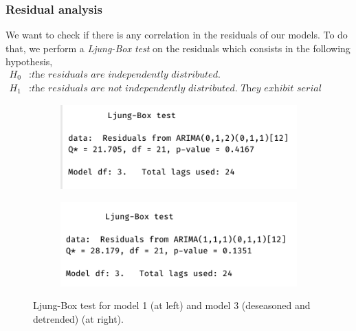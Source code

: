\subsubsection{Residual analysis}

We want to check if there is any correlation in the residuals of our models. To do that, we perform a \textit{Ljung-Box test} on the residuals which consists in the following hypothesis,
\begin{align*}
	H_0&: \textit{the residuals are independently distributed.} \\
	H_1&: \textit{the residuals are not independently distributed. They exhibit serial correlation instead.}
\end{align*}


\begin{figure}[H]
	\centering
	\begin{subfigure}{0.49\textwidth}
		\centering
		\includegraphics[width=\textwidth]{figures/box_jenkins/ljung_box_test_model1.png}
		\label{fig:ljung-box-test-model1}
	\end{subfigure}
	\begin{subfigure}{0.49\textwidth}
		\centering
		\includegraphics[width=\textwidth]{figures/box_jenkins//ljung_box_test_model3.png}
		\label{fig:ljung-box-test-model3}
	\end{subfigure}
	\caption{Ljung-Box test for model 1 (at left) and model 3 (deseasoned and detrended) (at right).}
\end{figure}

